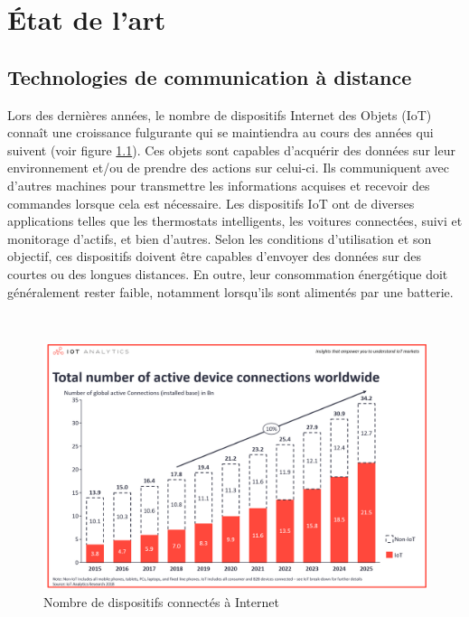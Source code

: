 \chapter{État de l'art}
\label{chap:2}

\section{Technologies de communication à distance}

\noindent
Lors des dernières années, le nombre de dispositifs Internet des Objets (IoT) connaît une croissance fulgurante qui se maintiendra au cours des années qui suivent (voir figure \ref{fig:iot_number}). Ces objets sont capables d'acquérir des données sur leur environnement et/ou de prendre des actions sur celui-ci. Ils communiquent avec d'autres machines pour transmettre les informations acquises et recevoir des commandes lorsque cela est nécessaire. Les dispositifs IoT ont de diverses applications telles que les thermostats intelligents, les voitures connectées, suivi et monitorage d'actifs, et bien d'autres. Selon les conditions d'utilisation et son objectif, ces dispositifs doivent être capables d'envoyer des données sur des courtes ou des longues distances. En outre, leur consommation énergétique doit généralement rester faible, notamment lorsqu'ils sont alimentés par une batterie.

~

\begin{figure}[ht!]
  \includegraphics[width=\textwidth]{img/state_of_the_art/iot_number_connected.png}
  \caption{Nombre de dispositifs connectés à Internet \cite{lueth_2018}}
  \label{fig:iot_number}
\end{figure}

